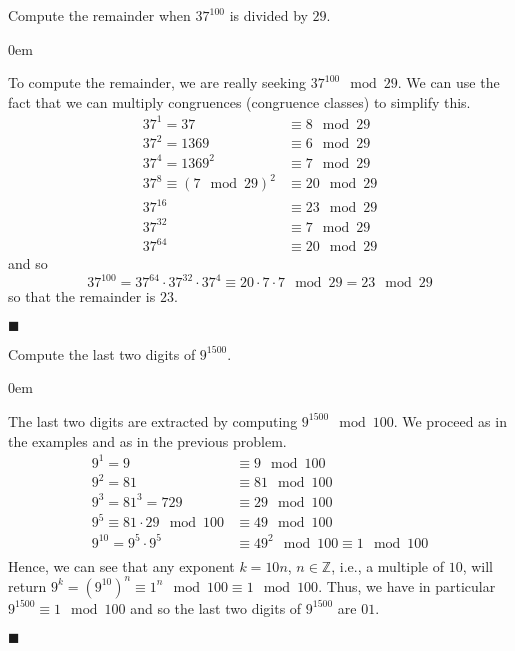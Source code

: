 \documentclass[12pt]{article}
\renewcommand{\qed}{\hfill$\blacksquare$}
\renewenvironment{proof}{\begin{addmargin}[1em]{0em}\begin{newproof}}{\end{newproof}\end{addmargin}\qed}
\newenvironment{problem}[2][Exercise]{\begin{trivlist}
\item[\hskip \labelsep {\bfseries #1}\hskip \labelsep {\bfseries #2.}]}{\end{trivlist}}
\begin{document}
\begin{problem}{0.3.4}
Compute the remainder when $37^{100}$ is divided by $29$.
\end{problem}
\begin{proof}
To compute the remainder, we are really seeking $37^{100}\mod 29$. We can use the fact that we can multiply congruences (congruence classes) to simplify this.
\begin{equation*}
	\begin{split}
		37^1  = 37 & \equiv 8 \mod 29 \\
		37^2  = 1369 & \equiv 6 \mod 29 \\
		37^4 = 1369^2 & \equiv 7 \mod 29 \\
		37^8 \equiv \left( 7\mod 29\right)^2 & \equiv 20 \mod 29 \\
		37^{16} & \equiv 23 \mod 29 \\
		37^{32} & \equiv 7  \mod 29 \\
		37^{64} & \equiv 20 \mod 29 
	\end{split}
\end{equation*}
and so \[ 37^{100}= 37^{64} \cdot 37^{32}\cdot 37^4 \equiv 20\cdot 7 \cdot 7 \mod 29  = 23 \mod 29 \] so that the remainder is $23$.
\end{proof}




\begin{problem}{0.3.5}
Compute the last two digits of $9^{1500}$.
\end{problem}
\begin{proof}
The last two digits are extracted by computing $9^{1500} \mod 100$. We proceed as in the examples and as in the previous problem.
\begin{equation*}
	\begin{split}
		9^1 = 9 & \equiv 9 \mod 100 \\
		9^2 = 81 & \equiv 81 \mod 100 \\
		9^3 = 81^3 = 729 & \equiv 29 \mod 100 \\
		9^5 \equiv 81\cdot 29 \mod 100 & \equiv 49 \mod 100 \\	
		9^{10} = 9^5 \cdot 9^5	 & \equiv 49^2 \mod 100 \equiv 1 \mod 100 \\
	\end{split}
\end{equation*}
Hence, we can see that any exponent $k=10n$, $n\in \mathbb{Z}$, i.e., a multiple of $10$, will return $9^k = \left(9^10\right)^n \equiv 1^n \mod 100 \equiv 1 \mod 100$. Thus, we have in particular $9^{1500} \equiv 1 \mod 100$ and so the last two digits of $9^{1500}$ are $01$. 
\end{proof}
\end{document}
